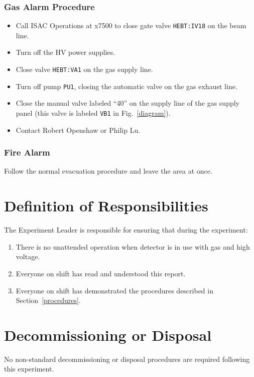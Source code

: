\subsubsection{Gas Alarm Procedure}
\begin{itemize}
\setlength{\itemsep}{0pt}
\setlength{\parskip}{0pt}
\item Call ISAC Operations at x7500 to close gate valve \texttt{HEBT:IV18} on the beam line.
\item Turn off the HV power supplies.
\item Close valve \texttt{HEBT:VA1} on the gas supply line.
\item Turn off pump \texttt{PU1}, closing the automatic valve on the gas exhaust line.
\item Close the manual valve labeled ``40'' on the supply line of the gas supply panel (this valve is labeled \texttt{VB1} in Fig.~\ref{diagram}).
\item Contact Robert Openshaw or Philip Lu.
\end{itemize}
\subsubsection{Fire Alarm}
Follow the normal evacuation procedure and leave the area at once.
\section{Definition of Responsibilities}
The Experiment Leader is responsible for ensuring that during the experiment:
\begin{enumerate}
\setlength{\itemsep}{0pt}
\setlength{\parskip}{0pt}
\item  There is no unattended operation when detector is in use with gas and high voltage.
\item  Everyone on shift has read and understood this report.
\item  Everyone on shift has demonstrated the procedures described in Section~\ref{procedures}.
\end{enumerate}

\section{Decommissioning or Disposal}
No non-standard decommissioning or disposal procedures are required following this experiment.